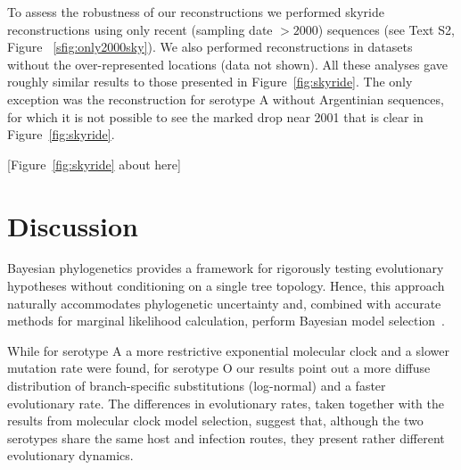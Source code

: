 \documentclass[10pt]{article}
\begin{document}
To assess the robustness of our reconstructions we performed skyride reconstructions using only recent (sampling date $>2000$) sequences (see Text S2, Figure ~\ref{sfig:only2000sky}).
We also performed reconstructions in datasets without the over-represented locations (data not shown). All these analyses gave roughly similar results to those presented in Figure~\ref{fig:skyride}. The only exception was the reconstruction for serotype A without Argentinian sequences, for which it is not possible to see the marked drop near 2001 that is clear in Figure~\ref{fig:skyride}. 

\begin{center}
 [Figure~\ref{fig:skyride} about here]
\end{center}

\section*{Discussion}
Bayesian phylogenetics provides a framework for rigorously testing evolutionary hypotheses without conditioning on a single tree topology. Hence, this approach naturally accommodates phylogenetic uncertainty and, combined with accurate methods for marginal likelihood calculation, perform Bayesian model selection~\cite{Baele2012,Baele2013a,Baele2013b}.

While for serotype A a more restrictive exponential molecular clock and a slower mutation rate were found, for serotype O our results point out a more diffuse distribution of branch-specific substitutions (log-normal) and a faster evolutionary rate.
The differences in evolutionary rates, taken together with the results from molecular clock model selection, suggest that, although the two serotypes share the same host and infection routes, they present rather different evolutionary dynamics. 
\end{document}
